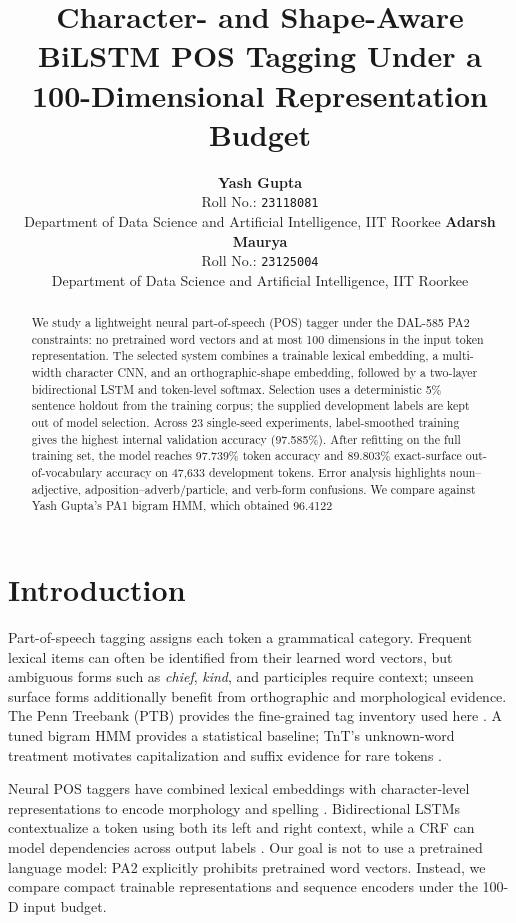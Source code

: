 \documentclass[11pt]{article}
\title{Character- and Shape-Aware BiLSTM POS Tagging Under a 100-Dimensional Representation Budget}
\author{\textbf{Yash Gupta}\\Roll No.: \texttt{23118081}\\Department of Data Science and Artificial Intelligence, IIT Roorkee \And \textbf{Adarsh Maurya}\\Roll No.: \texttt{23125004}\\Department of Data Science and Artificial Intelligence, IIT Roorkee}
\date{}
\begin{document}
\maketitle
\begin{abstract}
We study a lightweight neural part-of-speech (POS) tagger under the DAL-585 PA2 constraints: no pretrained word vectors and at most 100 dimensions in the input token representation. The selected system combines a trainable lexical embedding, a multi-width character CNN, and an orthographic-shape embedding, followed by a two-layer bidirectional LSTM and token-level softmax. Selection uses a deterministic 5\% sentence holdout from the training corpus; the supplied development labels are kept out of model selection. Across 23 single-seed experiments, label-smoothed training gives the highest internal validation accuracy (97.585\%). After refitting on the full training set, the model reaches 97.739\% token accuracy and 89.803\% exact-surface out-of-vocabulary accuracy on 47,633 development tokens. Error analysis highlights noun--adjective, adposition--adverb/particle, and verb-form confusions. We compare against Yash Gupta's PA1 bigram HMM, which obtained 96.4122%
\end{abstract}

\section{Introduction}
Part-of-speech tagging assigns each token a grammatical category. Frequent lexical items can often be identified from their learned word vectors, but ambiguous forms such as \emph{chief}, \emph{kind}, and participles require context; unseen surface forms additionally benefit from orthographic and morphological evidence. The Penn Treebank (PTB) provides the fine-grained tag inventory used here \citep{marcus1993}. A tuned bigram HMM provides a statistical baseline; TnT's unknown-word treatment motivates capitalization and suffix evidence for rare tokens \citep{brants2000}.

Neural POS taggers have combined lexical embeddings with character-level representations to encode morphology and spelling \citep{santos2014}. Bidirectional LSTMs contextualize a token using both its left and right context, while a CRF can model dependencies across output labels \citep{huang2015,mahovy2016}. Our goal is not to use a pretrained language model: PA2 explicitly prohibits pretrained word vectors. Instead, we compare compact trainable representations and sequence encoders under the 100-D input budget.
\end{document}
